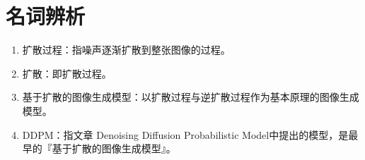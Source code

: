 \section*{名词辨析\label{sec_noun}}
{}

\begin{enumerate}
    \item 扩散过程：指噪声逐渐扩散到整张图像的过程。
    \item 扩散：即扩散过程。
    \item 基于扩散的图像生成模型：以扩散过程与逆扩散过程作为基本原理的图像生成模型。
    \item DDPM：指文章 Denoising Diffusion Probabilistic Model\cite{hoDenoisingDiffusionProbabilistic2020a}中提出的模型，是最早的『基于扩散的图像生成模型』。
\end{enumerate}